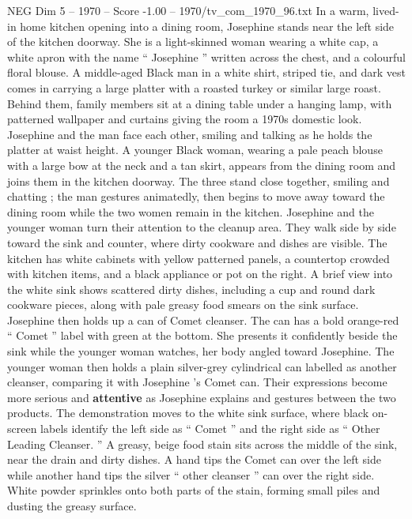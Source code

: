 \begin{textsample}{NEG Dim 5 – 1970 – Score -1.00 – 1970/tv\_com\_1970\_96.txt}  \label{ex:f5_neg_005}
In a warm, lived-in home kitchen opening into a dining room, Josephine stands near the left side of the kitchen doorway.
She is a light-skinned woman wearing a white cap, a white apron with the name “ Josephine ” written across the chest, and a colourful floral blouse.
A middle-aged Black man in a white shirt, striped tie, and dark vest comes in carrying a large platter with a roasted turkey or similar large roast.
Behind them, family members sit at a dining table under a hanging lamp, with patterned wallpaper and curtains giving the room a 1970s domestic look.
Josephine and the man face each other, smiling and talking as he holds the platter at waist height.
A younger Black woman, wearing a pale peach blouse with a large bow at the neck and a tan skirt, appears from the dining room and joins them in the kitchen doorway.
The three stand close together, smiling and chatting ; the man gestures animatedly, then begins to move away toward the dining room while the two women remain in the kitchen.
Josephine and the younger woman turn their attention to the cleanup area.
They walk side by side toward the sink and counter, where dirty cookware and dishes are visible.
The kitchen has white cabinets with yellow patterned panels, a countertop crowded with kitchen items, and a black appliance or pot on the right.
A brief view into the white sink shows scattered dirty dishes, including a cup and round dark cookware pieces, along with pale greasy food smears on the sink surface.
Josephine then holds up a can of Comet cleanser.
The can has a bold orange-red “ Comet ” label with green at the bottom.
She presents it confidently beside the sink while the younger woman watches, her body angled toward Josephine.
The younger woman then holds a plain silver-grey cylindrical can labelled as another cleanser, comparing it with Josephine ’s Comet can.
Their expressions become more serious and \textbf{attentive} as Josephine explains and gestures between the two products.
The demonstration moves to the white sink surface, where black on-screen labels identify the left side as “ Comet ” and the right side as “ Other Leading Cleanser. ” A greasy, beige food stain sits across the middle of the sink, near the drain and dirty dishes.
A hand tips the Comet can over the left side while another hand tips the silver “ other cleanser ” can over the right side.
White powder sprinkles onto both parts of the stain, forming small piles and dusting the greasy surface.

\end{textsample}
